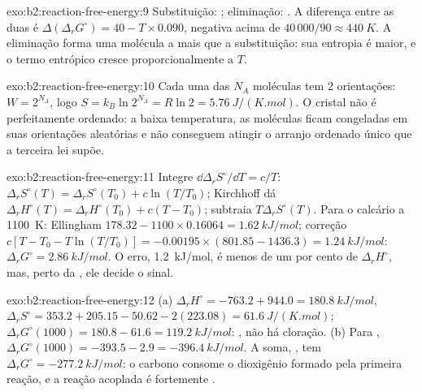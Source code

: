 \begin{solution}{exo:b2:reaction-free-energy:9}
Substituição: ; eliminação:
. A diferença entre as duas
 é $\Delta(\Delta_r G^\circ) = 40 - T \times
0.090$, negativa acima de $40\,000/90 \approx \qty{440}{K}$. A eliminação forma
uma molécula a mais que a substituição: sua entropia é maior, e o termo
entrópico cresce proporcionalmente a $T$.
\end{solution}

\begin{solution}{exo:b2:reaction-free-energy:10}
Cada uma das $N_A$ moléculas tem 2 orientações: $W = 2^{N_A}$, logo $S =
k_B\ln 2^{N_A} = R\ln 2 = \qty{5.76}{J/(K.mol)}$. O cristal não é
perfeitamente ordenado: a baixa temperatura, as moléculas ficam congeladas
em suas orientações aleatórias e não conseguem atingir o arranjo ordenado
único que a terceira lei supõe.
\end{solution}

\begin{solution}{exo:b2:reaction-free-energy:11}
Integre $\dd\Delta_r S^\circ/\dd T = c/T$: $\Delta_r S^\circ(T) = \Delta_r
S^\circ(T_0) + c\ln(T/T_0)$; Kirchhoff dá $\Delta_r H^\circ(T) = \Delta_r
H^\circ(T_0) + c(T - T_0)$; subtraia $T\Delta_r S^\circ(T)$. Para o calcário a
\qty{1100}{K}: Ellingham $178.32 - 1100 \times 0.16064 = \qty{1.62}{kJ/mol}$;
correção $c[T - T_0 - T\ln(T/T_0)] = -0.00195 \times (801.85 - 1436.3) =
\qty{+1.24}{kJ/mol}$: $\Delta_r G^\circ = \qty{2.86}{kJ/mol}$. O erro,
\qty{1.2}{kJ/mol}, é menos de um por cento de $\Delta_r H^\circ$, mas, perto
da , ele decide o sinal.
\end{solution}

\begin{solution}{exo:b2:reaction-free-energy:12}
(a) $\Delta_r H^\circ = -763.2 + 944.0 = \qty{+180.8}{kJ/mol}$, $\Delta_r
S^\circ = 353.2 + 205.15 - 50.62 - 2(223.08) = \qty{+61.6}{J/(K.mol)}$;
$\Delta_r G^\circ(1000) = 180.8 - 61.6 = \qty{+119.2}{kJ/mol}$: ,
não há cloração. (b) Para , $\Delta_r G^\circ(1000) =
-393.5 - 2.9 = \qty{-396.4}{kJ/mol}$. A soma, , tem $\Delta_r G^\circ = \qty{-277.2}{kJ/mol}$: o carbono
consome o dioxigênio formado pela primeira reação, e a reação acoplada é
fortemente .
\end{solution}

